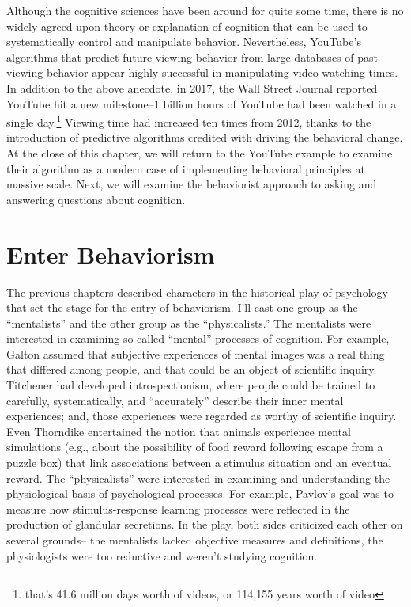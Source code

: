 \documentclass[
  oneside,
  12pt]{crumpbook}
\begin{document}
Although the cognitive sciences have been around for quite some time, there is no widely agreed upon theory or explanation of cognition that can be used to systematically control and manipulate behavior. Nevertheless, YouTube's algorithms that predict future viewing behavior from large databases of past viewing behavior appear highly successful in manipulating video watching times. In addition to the above anecdote, in 2017, the Wall Street Journal reported YouTube hit a new milestone--1 billion hours of YouTube had been watched in a single day.\footnote{that's 41.6 million days worth of videos, or 114,155 years worth of video} Viewing time had increased ten times from 2012, thanks to the introduction of predictive algorithms credited with driving the behavioral change. At the close of this chapter, we will return to the YouTube example to examine their algorithm as a modern case of implementing behavioral principles at massive scale. Next, we will examine the behaviorist approach to asking and answering questions about cognition.

\hypertarget{enter-behaviorism}{%
\section{Enter Behaviorism}\label{enter-behaviorism}}

The previous chapters described characters in the historical play of psychology that set the stage for the entry of behaviorism. I'll cast one group as the ``mentalists'' and the other group as the ``physicalists.'' The mentalists were interested in examining so-called ``mental'' processes of cognition. For example, Galton assumed that subjective experiences of mental images was a real thing that differed among people, and that could be an object of scientific inquiry. Titchener had developed introspectionism, where people could be trained to carefully, systematically, and ``accurately'' describe their inner mental experiences; and, those experiences were regarded as worthy of scientific inquiry. Even Thorndike entertained the notion that animals experience mental simulations (e.g., about the possibility of food reward following escape from a puzzle box) that link associations between a stimulus situation and an eventual reward. The ``physicalists'' were interested in examining and understanding the physiological basis of psychological processes. For example, Pavlov's goal was to measure how stimulus-response learning processes were reflected in the production of glandular secretions. In the play, both sides criticized each other on several grounds-- the mentalists lacked objective measures and definitions, the physiologists were too reductive and weren't studying cognition.
\end{document}
